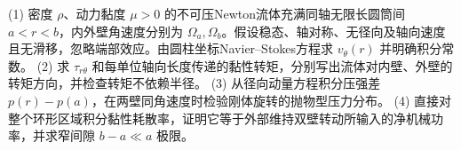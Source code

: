 (1) 密度 \(\rho\)、动力黏度 \(\mu>0\) 的不可压Newton流体充满同轴无限长圆筒间 \(a<r<b\)，内外壁角速度分别为 \(\Omega_a,\Omega_b\)。假设稳态、轴对称、无径向及轴向速度且无滑移，忽略端部效应。由圆柱坐标Navier–Stokes方程求 \(v_\theta(r)\) 并明确积分常数。
(2) 求 \(\tau_{r\theta}\) 和每单位轴向长度传递的黏性转矩，分别写出流体对内壁、外壁的转矩方向，并检查转矩不依赖半径。
(3) 从径向动量方程积分压强差 \(p(r)-p(a)\)，在两壁同角速度时检验刚体旋转的抛物型压力分布。
(4) 直接对整个环形区域积分黏性耗散率，证明它等于外部维持双壁转动所输入的净机械功率，并求窄间隙 \(b-a\ll a\) 极限。
